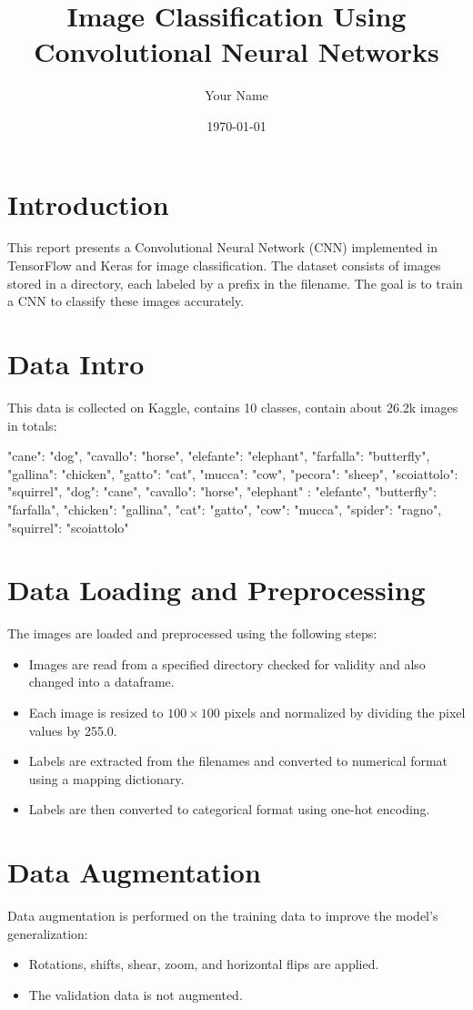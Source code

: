 \documentclass{article}
\title{Image Classification Using Convolutional Neural Networks}
\author{Your Name}
\date{\today}
\begin{document}
\maketitle

\section{Introduction}
This report presents a Convolutional Neural Network (CNN) implemented in TensorFlow and Keras for image classification. The dataset consists of images stored in a directory, each labeled by a prefix in the filename. The goal is to train a CNN to classify these images accurately.

\section{Data Intro}
This data is collected on Kaggle, contains 10 classes, contain about 26.2k images in totals:

"cane": "dog", "cavallo": "horse", "elefante": "elephant", "farfalla": "butterfly", "gallina": "chicken", "gatto": "cat", "mucca": "cow", "pecora": "sheep", "scoiattolo": "squirrel", "dog": "cane", "cavallo": "horse", "elephant" : "elefante", "butterfly": "farfalla", "chicken": "gallina", "cat": "gatto", "cow": "mucca", "spider": "ragno", "squirrel": "scoiattolo"


\section{Data Loading and Preprocessing}
The images are loaded and preprocessed using the following steps:
\begin{itemize}
    \item Images are read from a specified directory checked for validity and also changed into a dataframe.
    \item Each image is resized to $100 \times 100$ pixels and normalized by dividing the pixel values by 255.0.
    \item Labels are extracted from the filenames and converted to numerical format using a mapping dictionary.
    \item Labels are then converted to categorical format using one-hot encoding.
\end{itemize}


\section{Data Augmentation}
Data augmentation is performed on the training data to improve the model's generalization:
\begin{itemize}
    \item Rotations, shifts, shear, zoom, and horizontal flips are applied.
    \item The validation data is not augmented.
\end{itemize}
\end{document}
